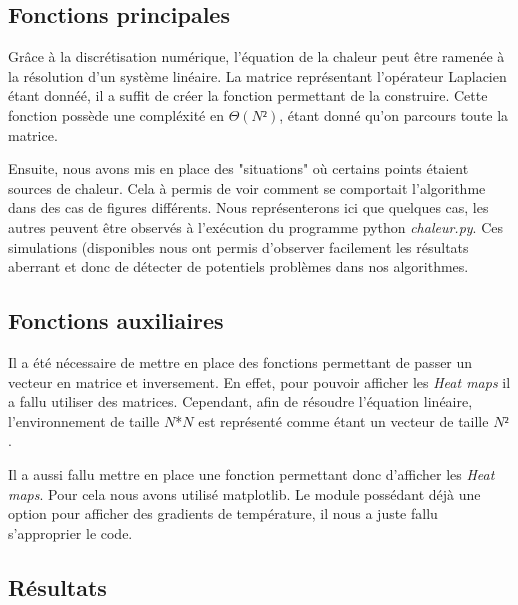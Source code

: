 

\subsection{Fonctions principales}
\label{ssec:fonc_princ}
Grâce à la discrétisation numérique, l'équation de la chaleur peut être ramenée à la résolution d'un système linéaire. 
La matrice représentant l'opérateur Laplacien étant donnéé, il a suffit de créer la fonction permettant de la construire.
Cette fonction possède une compléxité en $\Theta(N²)$, étant donné qu'on parcours toute la matrice.

Ensuite, nous avons mis en place des "situations" où certains points étaient sources de chaleur. Cela à permis de voir comment se comportait l'algorithme dans des cas de figures différents. Nous représenterons ici que quelques cas, les autres peuvent être observés à l'exécution du programme python \emph{chaleur.py}. Ces simulations (disponibles nous ont permis d'observer facilement les résultats aberrant et donc de détecter de potentiels problèmes dans nos algorithmes.



\subsection{Fonctions auxiliaires}
\label{ssec:fonc_aux}
Il a été nécessaire de mettre en place des fonctions permettant de passer un vecteur en matrice et inversement.
En effet, pour pouvoir afficher les \emph{Heat maps} il a fallu utiliser des matrices. Cependant, afin de résoudre l'équation linéaire, l'environnement de taille $N$*$N$ est représenté comme étant un vecteur de taille $N²$.

Il a aussi fallu mettre en place une fonction permettant donc d'afficher les \emph{Heat maps}. Pour cela nous avons utilisé matplotlib.
Le module possédant déjà une option pour afficher des gradients de température, il nous a juste fallu s'approprier le code.


\subsection{Résultats}
\label{ssec:res}




